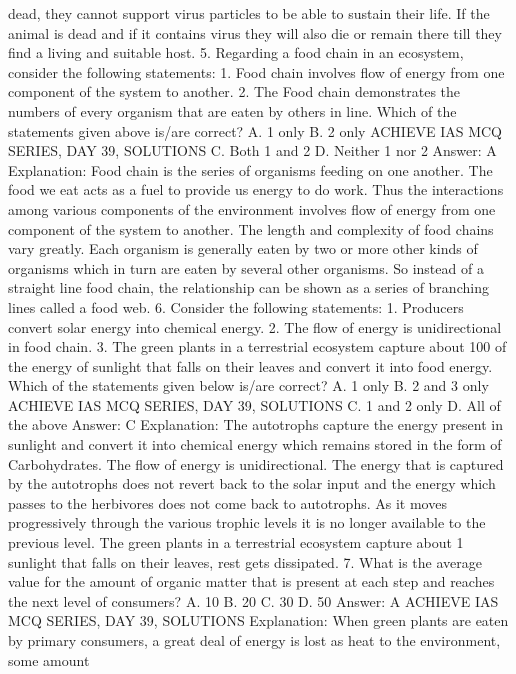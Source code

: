 dead, they cannot support virus particles to be able to sustain their
life. If the animal is dead and if it contains virus they will also die or
remain there till they find a living and suitable host.
5. Regarding a food chain in an ecosystem, consider the
following statements:
1. Food chain involves flow of energy from one component of the
system to another.
2. The Food chain demonstrates the numbers of every organism that
are eaten by others in line.
Which of the statements given above is/are correct?
A. 1 only
B. 2 only
ACHIEVE IAS MCQ SERIES, DAY 39, SOLUTIONS
C. Both 1 and 2
D. Neither 1 nor 2
Answer: A
Explanation: Food chain is the series of organisms feeding on one
another. The food we eat acts as a fuel to provide us energy to do
work. Thus the interactions among various components of the
environment involves flow of energy from one component of the
system to another. The length and complexity of food chains vary
greatly. Each organism is generally eaten by two or more other kinds
of organisms which in turn are eaten by several other organisms. So
instead of a straight line food chain, the relationship can be shown
as a series of branching lines called a food web.
6. Consider the following statements:
1. Producers convert solar energy into chemical energy.
2. The flow of energy is unidirectional in food chain.
3. The green plants in a terrestrial ecosystem capture about 100%
of the energy of sunlight that falls on their leaves and convert it
into food energy.
Which of the statements given below is/are correct?
A. 1 only
B. 2 and 3 only
ACHIEVE IAS MCQ SERIES, DAY 39, SOLUTIONS
C. 1 and 2 only
D. All of the above
Answer: C
Explanation: The autotrophs capture the energy present in sunlight
and convert it into chemical energy which remains stored in the form
of Carbohydrates.
The flow of energy is unidirectional. The energy that is captured by
the autotrophs does not revert back to the solar input and the
energy which passes to the herbivores does not come back to
autotrophs. As it moves progressively through the various trophic
levels it is no longer available to the previous level. The green plants
in a terrestrial ecosystem capture about 1%
sunlight that falls on their leaves, rest gets dissipated.
7. What is the average value for the amount of organic matter
that is present at each step and reaches the next level of
consumers?
A. 10%
B. 20%
C. 30%
D. 50%
Answer: A
ACHIEVE IAS MCQ SERIES, DAY 39, SOLUTIONS
Explanation: When green plants are eaten by primary consumers, a
great deal of energy is lost as heat to the environment, some amount
